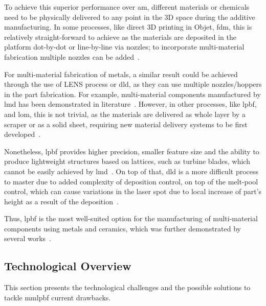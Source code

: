 To achieve this superior performance over \gls{am}, different materials or chemicals need to be physically
delivered to any point in the 3D space during the additive manufacturing. In
some processes, like direct 3D printing in Objet, \gls{fdm}, this is
relatively straight-forward to achieve as the materials are deposited in the
platform dot-by-dot or line-by-line via nozzles; to incorporate multi-material
fabrication multiple nozzles can be added~\cite{vaezi2013multiple}.

For multi-material fabrication of metals, a similar result could be achieved
through the use of LENS process or \gls{dld}, as they can use multiple
nozzles/hoppers in the part fabrication. For example, multi-material components
manufactured by \gls{lmd} has been demonstrated in literature~\cite{brueckner2018enhanced,shah2014parametric}.
However, in other processes, like \gls{lpbf}, and \gls{lom}, this is not trivial, as the materials are delivered as
whole layer by a scraper or as a solid sheet, requiring new material delivery
systems to be first developed~\cite{vaezi2013multiple}.

Nonetheless, \gls{lpbf}
provides higher precision, smaller feature size and the ability to produce
lightweight structures based on lattices, such as turbine blades, which cannot be easily achieved by
\gls{lmd}~\cite{liu2019additive,bartolomeu2021selective}.
On top of that, \gls{dld} is a
more difficult process to master due to added complexity of deposition control,
on top of the melt-pool control, which can cause variations in the laser spot
due to local increase of part's height as a result of the
deposition~\cite{shamsaei2015overview}.

Thus, \gls{lpbf} is the most well-suited option for the manufacturing of
multi-material components using metals and ceramics, which was further
demonstrated by several works~\cite{walker2022multi, anstaett2017fabrication,
  sing2015interfacial, LIU2014116}.

\subsection{Technological Overview}%
\label{sec:overview}
This section presents the technological challenges and the possible solutions
to tackle \gls{mmlpbf} current drawbacks.

